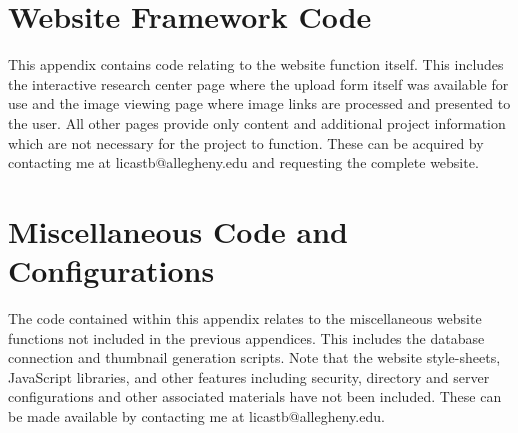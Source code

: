 \chapter{Website Framework Code}\label{appb:wejbcode}
This appendix contains code relating to the website function itself. This includes the interactive research center page where the upload form itself was available for use and the image viewing page where image links are processed and presented to the user. All other pages provide only content and additional project information which are not necessary for the project to function. These can be acquired by contacting me at licastb@allegheny.edu and requesting the complete website.



\chapter{Miscellaneous Code and Configurations}\label{appc:misccode}
The code contained within this appendix relates to the miscellaneous website functions not included in the previous appendices. This includes the database connection and thumbnail generation scripts. Note that the website style-sheets, JavaScript libraries, and other features including security, directory and server configurations and other associated materials have not been included. These can be made available by contacting me at licastb@allegheny.edu.

